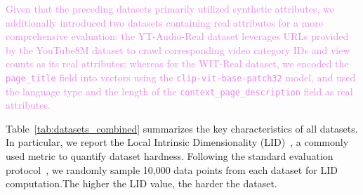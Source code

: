 \documentclass[sigconf, nonacm]{acmart}
\begin{document}
	\textcolor{violet}{Given that the preceding datasets primarily utilized synthetic attributes, we additionally introduced two datasets containing real attributes for a more comprehensive evaluation: the YT-Audio-Real dataset leverages URLs provided by the YouTube8M dataset to crawl corresponding video category IDs and view counts as its real attributes; whereas for the WIT-Real dataset, we encoded the \texttt{page\_title} field into vectors using the \texttt{clip-vit-base-patch32} model, and used the language type and the length of the \texttt{context\_page\_description} field as real attributes.}
	
	
	Table~\ref{tab:datasets_combined} summarizes the key characteristics of all datasets. In particular, we report the Local Intrinsic Dimensionality (LID)~\cite{Lid}, a commonly used metric to quantify dataset hardness. Following the standard evaluation protocol~\cite{LID2}, we randomly sample 10,000 data points from each dataset for LID computation.The higher the LID value, the harder the dataset.
	
	
	\renewcommand{\arraystretch}{0.9}
	\begin{table}[t]
		\centering
		
		
		
		\caption{Datasets}
		
		\label{tab:datasets_combined}
	\end{table}
	
\end{document}
